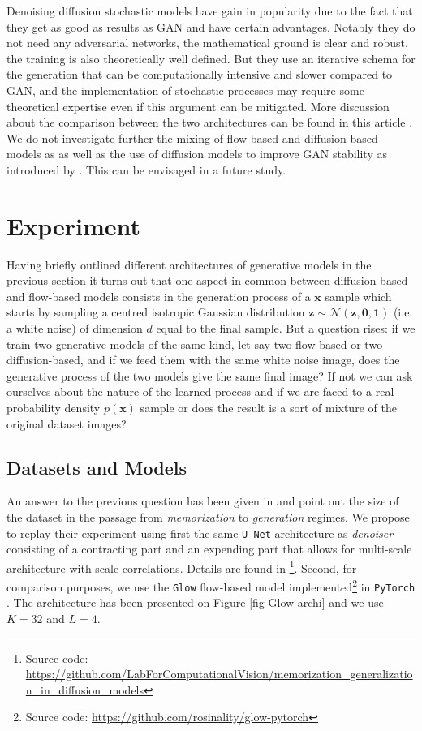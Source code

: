 \documentclass[11pt]{amsart}
\begin{document}
Denoising diffusion stochastic models have gain in popularity due to the fact that they get as good as results as GAN and have certain advantages. Notably they do not need any adversarial networks, the mathematical ground is clear and robust, the training is also theoretically well defined. But they use an iterative schema for the generation that can be computationally intensive and slower compared to GAN, and the implementation of stochastic processes may require some theoretical expertise even if this argument can be mitigated. More discussion about the comparison between the two architectures  can be found in this article \cite{dhariwal2021diffusion}. We do not investigate further the mixing of flow-based and diffusion-based models as \citep[e.g.][]{zhang2021diffusion,gong2021interpreting} as well as the use of diffusion models to improve GAN stability as introduced by \cite{Wang2022}. This can be envisaged in a future study.
%
\section{Experiment}
%
Having briefly outlined different architectures of generative models in the previous section it turns out that one aspect in common between diffusion-based and flow-based models consists in the generation process of a $\bm{x}$ sample which starts by sampling a centred isotropic Gaussian distribution $\bm{z}\sim \mathcal{N}(\bm{z},\bm{0},\bm{1})$ (i.e. a white noise) of dimension $d$ equal to the final sample. But a question rises: if we train two generative models of the same kind, let say two flow-based or two diffusion-based, and if we feed them with the same white noise image, does the generative process of the two models give the same final image? If not we can ask ourselves about the nature of the learned process and if we are faced to a real probability density $p(\bm{x})$ sample or does the result is a sort of mixture of the original dataset images? 

 
%
\subsection{Datasets and Models}
%
An answer to the previous question has been given in \cite{kadkhodaie2024generalization} and point out the size of the dataset in the passage from \textit{memorization} to \textit{generation} regimes. We propose to replay their experiment using first the same \texttt{U-Net} architecture \citep{2015arXiv150504597R}  as \textit{denoiser} consisting of a contracting part and an expending part that allows for multi-scale architecture with scale correlations. Details are found in \cite{kadkhodaie2024generalization}\footnote{Source code:  \url{https://github.com/LabForComputationalVision/memorization_generalization_in_diffusion_models}}. Second, for comparison purposes, we use the \texttt{Glow} flow-based model implemented\footnote{Source code: \url{https://github.com/rosinality/glow-pytorch}} in \texttt{PyTorch}  \citep{PyTorch2019}. The architecture has been presented on Figure \ref{fig-Glow-archi} and we use $K=32$ and $L=4$.
\end{document}
